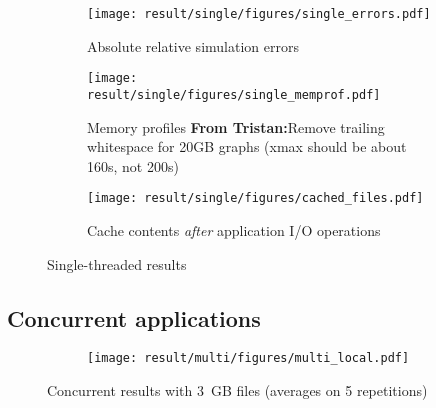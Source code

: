 \documentclass[conference]{IEEEtran}
\newcommand{\tristan}[1]{\color{orange}\textbf{From Tristan:}#1\color{black}}
\begin{document}
            \begin{figure*}
            \centering
            \begin{subfigure}{\linewidth}
                \centering
                   \texttt{[image: result/single/figures/single\_errors.pdf]}
                   \vspace*{-0.7cm}
                   \caption{Absolute relative simulation errors}
                   \vspace*{0.5cm}
                   \label{fig:single_error}
                \end{subfigure}
            \begin{subfigure}{\linewidth}
                \centering
                   \texttt{[image: result/single/figures/single\_memprof.pdf]}
                   \vspace*{-0.7cm}
                   \caption{Memory profiles \tristan{Remove trailing whitespace for 20GB graphs (xmax should be about 160s, not 200s)}}
                   \vspace*{0.5cm}
                   \label{fig:single_memprof}
            \end{subfigure}
            \begin{subfigure}{\linewidth}
                \centering
                   \texttt{[image: result/single/figures/cached\_files.pdf]}
                   \caption{Cache contents \emph{after} application I/O operations}
                   \label{fig:single_cache}
            \end{subfigure}
            \caption{Single-threaded results}
            \end{figure*}



        \subsection{Concurrent applications}

            \begin{figure*}
            \begin{subfigure}{\linewidth}
                \centering
                \texttt{[image: result/multi/figures/multi\_local.pdf]}
            \end{subfigure}
            \caption{Concurrent results with 3~GB files (averages on 5 repetitions)}
            \label{fig:multi_local}
            \end{figure*}
\end{document}
